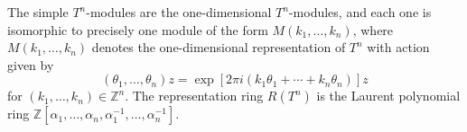The simple $T^n$-modules are the one-dimensional $T^n$-modules, and each one is isomorphic to precisely one module of the form $M(k_1, \ldots, k_n)$, where $M(k_1, \ldots, k_n)$ denotes the one-dimensional representation of $T^n$ with action given by
$$(\theta_1, \ldots, \theta_n)z = \exp[2\pi i(k_1 \theta_1 + \cdots + k_n \theta_n)]z$$
for $(k_1, \ldots, k_n) \in \mathbb{Z}^n$. The representation ring $R(T^n)$ is the Laurent polynomial ring $\mathbb{Z}[\alpha_1, \ldots, \alpha_n, \alpha_1^{-1}, \ldots, \alpha_n^{-1}]$.
